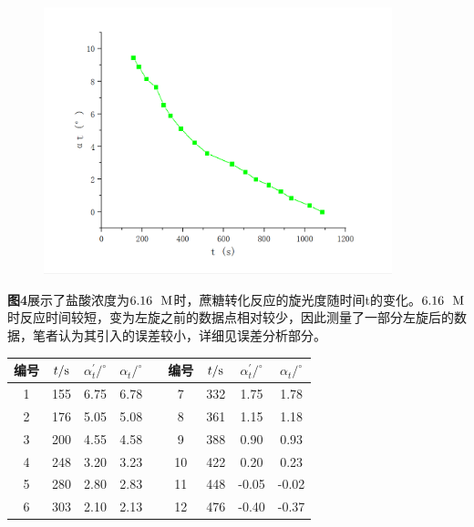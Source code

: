 \documentclass[12pt]{article}
\begin{document}
			\begin{figure}[!h]
				\centering
				\includegraphics[width=0.90\textwidth]{3.png}
			\end{figure}
			\par
			\textbf{图4}展示了盐酸浓度为$6.16\ \ {\rm M}$时，蔗糖转化反应的旋光度随时间t的变化。$6.16\ \ {\rm M}$时反应时间较短，变为左旋之前的数据点相对较少，因此测量了一部分左旋后的数据，笔者认为其引入的误差较小，详细见误差分析部分。\par
			\begin{table}[!h]
				\centering
				\begin{tabular}{ccccccccc}
					\toprule
					编号 & $t/{\rm s}$ & $\alpha^{\prime}_{t}/^{\circ}$ & $\alpha_{t}/^{\circ}$&&编号& $t/{\rm s}$ & $\alpha^{\prime}_{t}/^{\circ}$ & $\alpha_{t}/^{\circ}$\\
					\midrule
					1 & 155 & 6.75 & 6.78 &  & 7  & 332 & 1.75  & 1.78  \\
					2 & 176 & 5.05 & 5.08 &  & 8  & 361 & 1.15  & 1.18  \\
					3 & 200 & 4.55 & 4.58 &  & 9  & 388 & 0.90  & 0.93  \\
					4 & 248 & 3.20 & 3.23 &  & 10 & 422 & 0.20  & 0.23  \\
					5 & 280 & 2.80 & 2.83 &  & 11 & 448 & -0.05 & -0.02 \\
					6 & 303 & 2.10 & 2.13 &  & 12 & 476 & -0.40 & -0.37 \\
					\bottomrule
				\end{tabular}
			\end{table}
\end{document}
